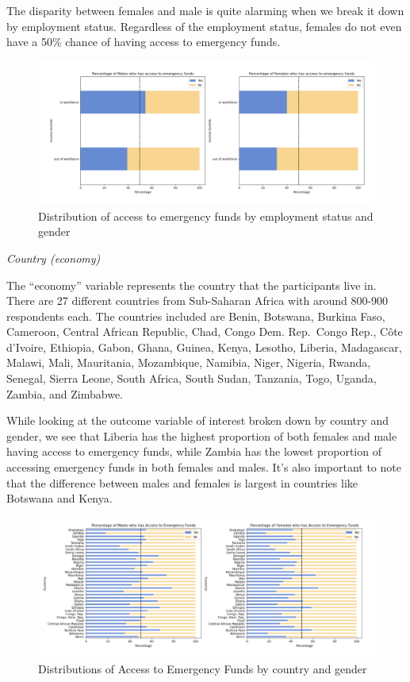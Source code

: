 \documentclass[12pt]{article}
\begin{document}
The disparity between females and male is quite alarming when we break
it down by employment status. Regardless of the employment status,
females do not even have a 50\% chance of having access to emergency
funds.

\begin{figure}

{\centering \includegraphics[width=1\linewidth]{graphs/employ_graph9} 

}

\caption{Distribution of access to emergency funds by employment status and gender}\label{fig:unnamed-chunk-12}
\end{figure}

\emph{Country (economy)}

The ``economy'' variable represents the country that the participants
live in. There are 27 different countries from Sub-Saharan Africa with
around 800-900 respondents each. The countries included are Benin,
Botswana, Burkina Faso, Cameroon, Central African Republic, Chad, Congo
Dem. Rep.~Congo Rep., Côte d'Ivoire, Ethiopia, Gabon, Ghana, Guinea,
Kenya, Lesotho, Liberia, Madagascar, Malawi, Mali, Mauritania,
Mozambique, Namibia, Niger, Nigeria, Rwanda, Senegal, Sierra Leone,
South Africa, South Sudan, Tanzania, Togo, Uganda, Zambia, and Zimbabwe.

While looking at the outcome variable of interest broken down by country
and gender, we see that Liberia has the highest proportion of both
females and male having access to emergency funds, while Zambia has the
lowest proportion of accessing emergency funds in both females and
males. It's also important to note that the difference between males and
females is largest in countries like Botswana and Kenya.

\begin{figure}

{\centering \includegraphics[width=1\linewidth]{graphs/country_graph10} 

}

\caption{Distributions of Access to Emergency Funds by country and gender}\label{fig:unnamed-chunk-13}
\end{figure}
\end{document}
